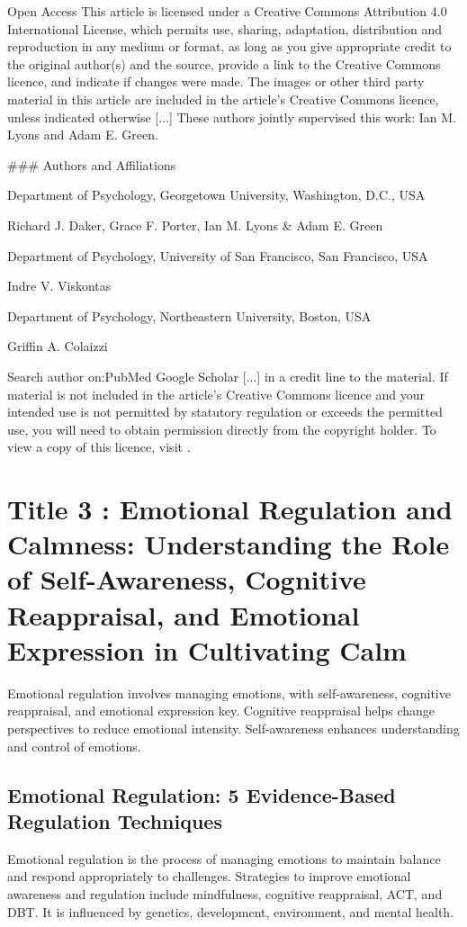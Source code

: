 \documentclass[12pt]{article}
\begin{document}
Open Access This article is licensed under a Creative Commons Attribution 4.0 International License, which permits use, sharing, adaptation, distribution and reproduction in any medium or format, as long as you give appropriate credit to the original author(s) and the source, provide a link to the Creative Commons licence, and indicate if changes were made. The images or other third party material in this article are included in the article's Creative Commons licence, unless indicated otherwise [...] These authors jointly supervised this work: Ian M. Lyons and Adam E. Green.

\#\#\# Authors and Affiliations

Department of Psychology, Georgetown University, Washington, D.C., USA

Richard J. Daker, Grace F. Porter, Ian M. Lyons \& Adam E. Green

Department of Psychology, University of San Francisco, San Francisco, USA

Indre V. Viskontas

Department of Psychology, Northeastern University, Boston, USA

Griffin A. Colaizzi

Search author on:PubMed Google Scholar [...] in a credit line to the material. If material is not included in the article's Creative Commons licence and your intended use is not permitted by statutory regulation or exceeds the permitted use, you will need to obtain permission directly from the copyright holder. To view a copy of this licence, visit .
\section{Title 3 : Emotional Regulation and Calmness: Understanding the Role of Self-Awareness, Cognitive Reappraisal, and Emotional Expression in Cultivating Calm}
Emotional regulation involves managing emotions, with self-awareness, cognitive reappraisal, and emotional expression key. Cognitive reappraisal helps change perspectives to reduce emotional intensity. Self-awareness enhances understanding and control of emotions.\subsection{Emotional Regulation: 5 Evidence-Based Regulation Techniques}
Emotional regulation is the process of managing emotions to maintain balance and respond appropriately to challenges.
   Strategies to improve emotional awareness and regulation include mindfulness, cognitive reappraisal, ACT, and DBT.
   It is influenced by genetics, development, environment, and mental health.
\end{document}

